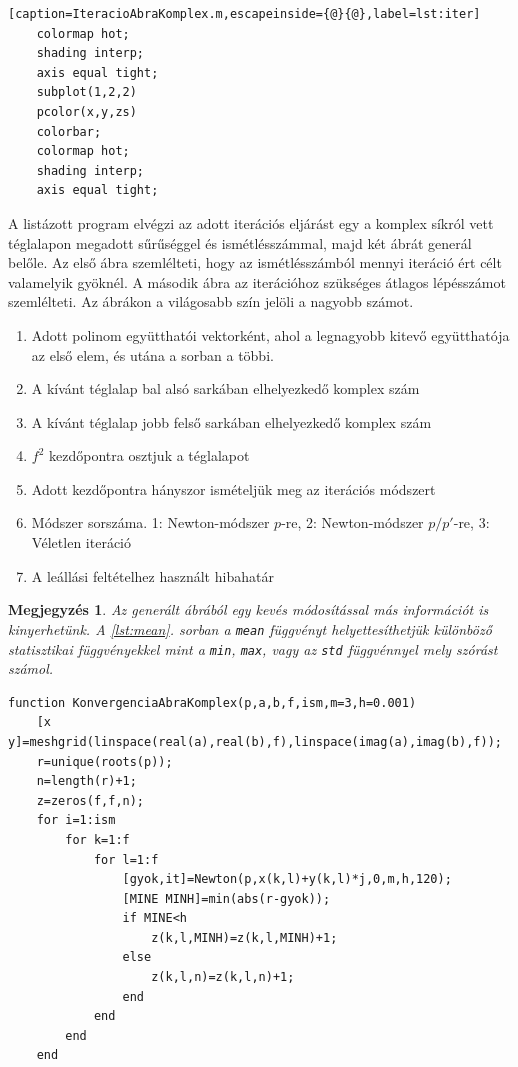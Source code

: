 \documentclass[a4paper,12pt]{report}
\newtheorem{Megj}[Tet]{Megjegyzés}
\begin{document}
\begin{appendices}
\begin{lstlisting}[caption=IteracioAbraKomplex.m,escapeinside={@}{@},label=lst:iter]
    colormap hot;                                                           
    shading interp;                                                         
    axis equal tight;                                                       
    subplot(1,2,2)                                                          
    pcolor(x,y,zs)                                                          
    colorbar;                                                               
    colormap hot;                                                           
    shading interp;                                                         
    axis equal tight;
			\end{lstlisting}
			A listázott program elvégzi az adott iterációs eljárást egy a komplex síkról vett téglalapon megadott sűrűséggel és ismétlésszámmal, majd két ábrát generál belőle. Az első ábra szemlélteti, hogy az ismétlésszámból mennyi iteráció ért célt valamelyik gyöknél. A második ábra az iterációhoz szükséges átlagos lépésszámot szemlélteti. Az ábrákon a világosabb szín jelöli a nagyobb számot.
			\begin{enumerate}
				\item[p:] Adott polinom együtthatói vektorként, ahol a legnagyobb kitevő együtthatója az első elem, és utána a sorban a többi.
				\item[a:] A kívánt téglalap bal alsó sarkában elhelyezkedő komplex szám
				\item[b:] A kívánt téglalap jobb felső sarkában elhelyezkedő komplex szám
				\item[f:] $f^2$ kezdőpontra osztjuk a téglalapot
				\item[ism:] Adott kezdőpontra hányszor ismételjük meg az iterációs módszert
				\item[m:] Módszer sorszáma. 1: Newton-módszer $p$-re, 2: Newton-módszer $p/p'$-re, 3: Véletlen iteráció
				\item[h:] A leállási feltételhez használt hibahatár
			\end{enumerate}
			\begin{Megj}\label{app:megj}
				Az generált ábrából egy kevés módosítással más információt is kinyerhetünk. A \ref{lst:mean}. sorban a \texttt{mean} függvényt helyettesíthetjük különböző statisztikai függvényekkel mint a \texttt{min}, \texttt{max}, vagy az \texttt{std} függvénnyel mely szórást számol.
			\end{Megj} 
			\begin{lstlisting}[caption=KonvergenciaAbraKomplex.m]
function KonvergenciaAbraKomplex(p,a,b,f,ism,m=3,h=0.001)
    [x y]=meshgrid(linspace(real(a),real(b),f),linspace(imag(a),imag(b),f));
    r=unique(roots(p));
    n=length(r)+1;
    z=zeros(f,f,n);
    for i=1:ism
        for k=1:f
            for l=1:f
                [gyok,it]=Newton(p,x(k,l)+y(k,l)*j,0,m,h,120);
                [MINE MINH]=min(abs(r-gyok));
                if MINE<h
                    z(k,l,MINH)=z(k,l,MINH)+1;
                else
                    z(k,l,n)=z(k,l,n)+1;
                end
            end
        end
    end


\end{lstlisting}
\end{appendices}
\end{document}

